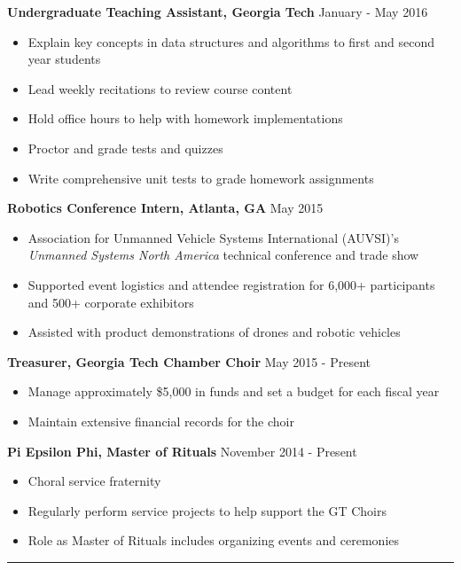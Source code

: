 \documentclass[11pt]{article}
\begin{document}
\textbf{Undergraduate Teaching Assistant, Georgia Tech} \hfill January - May 2016
\begin{itemize}
\setlength\itemsep{0.5pt}
    \item Explain key concepts in data structures and algorithms to first and second year students
    \item Lead weekly recitations to review course content
    \item Hold office hours to help with homework implementations
    \item Proctor and grade tests and quizzes
    \item Write comprehensive unit tests to grade homework assignments
\end{itemize}

\textbf{Robotics Conference Intern, Atlanta, GA} \hfill May 2015
\begin{itemize}
\setlength\itemsep{0.5pt}
    \item Association for Unmanned Vehicle Systems International (AUVSI)'s \emph{Unmanned Systems North America} technical conference and trade show
    \item Supported event logistics and attendee registration for 6,000+ participants and 500+ corporate exhibitors
    \item Assisted with product demonstrations of drones and robotic vehicles
\end{itemize}

\textbf{Treasurer, Georgia Tech Chamber Choir} \hfill May 2015 - Present
\begin{itemize}
\setlength\itemsep{0.5pt}
    \item Manage approximately \$5,000 in funds and set a budget for each fiscal year
    \item Maintain extensive financial records for the choir
\end{itemize}

\textbf{Pi Epsilon Phi, Master of Rituals} \hfill November 2014 - Present
\begin{itemize}
\setlength\itemsep{0.5pt}
    \item Choral service fraternity
    \item Regularly perform service projects to help support the GT Choirs
    \item Role as Master of Rituals includes organizing events and ceremonies
\end{itemize}

\rule{\textwidth}{.5pt}
\end{document}
